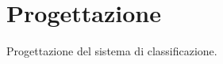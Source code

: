 \chapter{Progettazione}\label{ch:classificazione:design}
Progettazione del sistema di classificazione.
